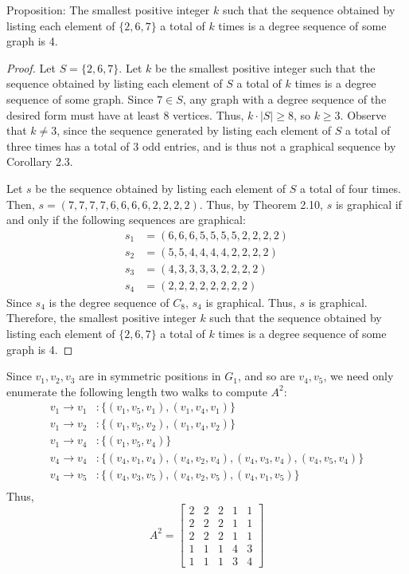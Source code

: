 \documentclass[12pt]{article}
\begin{document}
\newpage{} Proposition: The smallest positive integer $k$ such that the sequence obtained by listing each element of $\{2,6,7\}$ a total of $k$ times is a degree sequence of some graph is 4.
\begin{proof}
    Let $S = \{2,6,7\}$.
    Let $k$ be the smallest positive integer such that the sequence obtained by listing each element of $S$ a total of $k$ times is a degree sequence of some graph.
    Since $7 \in S$, any graph with a degree sequence of the desired form must have at least 8 vertices.
    Thus, $k \cdot |S| \geq 8$, so $k \geq 3$.
    Observe that $k \neq 3$, since the sequence generated by listing each element of $S$ a total of three times has a total of 3 odd entries, and is thus not a graphical sequence by Corollary 2.3.

    Let $s$ be the sequence obtained by listing each element of $S$ a total of four times.
    Then, $s = (7,7,7,7,6,6,6,6,2,2,2,2)$.
    Thus, by Theorem 2.10, $s$ is graphical if and only if the following sequences are graphical:
    \begin{align*}
        s_1 &= (6,6,6,5,5,5,5,2,2,2,2) \\
        s_2 &=   (5,5,4,4,4,4,2,2,2,2) \\
        s_3 &=     (4,3,3,3,3,2,2,2,2) \\
        s_4 &=       (2,2,2,2,2,2,2,2)
    \end{align*}
    Since $s_4$ is the degree sequence of $C_8$, $s_4$ is graphical.
    Thus, $s$ is graphical.
    Therefore, the smallest positive integer $k$ such that the sequence obtained by listing each element of $\{2,6,7\}$ a total of $k$ times is a degree sequence of some graph is 4.
\end{proof}

\newpage{}

Since $v_1, v_2, v_3$ are in symmetric positions in $G_1$, and so are $v_4, v_5$, we need only enumerate the following length two walks to compute $A^2$:
\begin{align*}
    v_1 \to v_1 &: \{(v_1, v_5, v_1), (v_1, v_4, v_1)\} \\
    v_1 \to v_2 &: \{(v_1, v_5, v_2), (v_1, v_4, v_2)\} \\
    v_1 \to v_4 &: \{(v_1, v_5, v_4)\} \\
    v_4 \to v_4 &: \{(v_4, v_1, v_4), (v_4, v_2, v_4), (v_4, v_3, v_4), (v_4, v_5, v_4)\} \\
    v_4 \to v_5 &: \{(v_4, v_3, v_5), (v_4, v_2, v_5), (v_4, v_1, v_5)\} \\
\end{align*}
Thus, $$A^2 = \begin{bmatrix}
                2 & 2 & 2 & 1 & 1 \\
                2 & 2 & 2 & 1 & 1 \\
                2 & 2 & 2 & 1 & 1 \\
                1 & 1 & 1 & 4 & 3 \\
                1 & 1 & 1 & 3 & 4
              \end{bmatrix}$$
\end{document}
